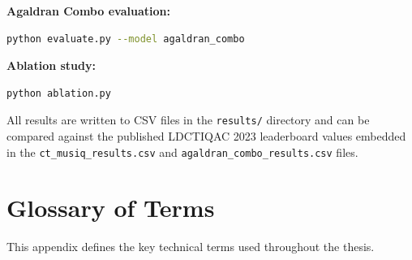 \textbf{Agaldran Combo evaluation:}
\begin{lstlisting}[language=bash, basicstyle=\ttfamily\small, frame=single]
python evaluate.py --model agaldran_combo
\end{lstlisting}

\textbf{Ablation study:}
\begin{lstlisting}[language=bash, basicstyle=\ttfamily\small, frame=single]
python ablation.py
\end{lstlisting}

All results are written to CSV files in the \texttt{results/} directory and can be
compared against the published LDCTIQAC 2023 leaderboard values embedded in the
\texttt{ct\_musiq\_results.csv} and \texttt{agaldran\_combo\_results.csv} files.

\chapter{Glossary of Terms}
\label{app:glossary}

This appendix defines the key technical terms used throughout the thesis.

